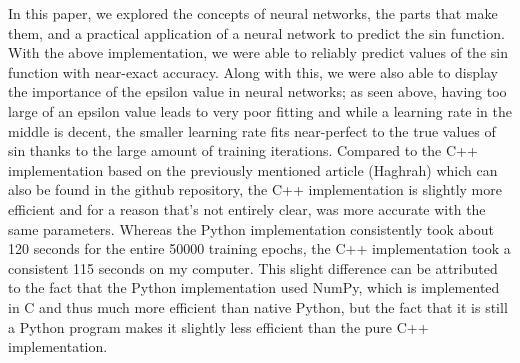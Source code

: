 \documentclass[12pt, letter]{article}
\begin{document}
In this paper, we explored the concepts of neural networks, the parts that make them, and a practical application of a neural network to predict the sin function. With the above implementation, we were able to reliably predict values of the sin function with near-exact accuracy. Along with this, we were also able to display the importance of the epsilon value in neural networks; as seen above, having too large of an epsilon value leads to very poor fitting and while a learning rate in the middle is decent, the smaller learning rate fits near-perfect to the true values of sin thanks to the large amount of training iterations. Compared to the C++ implementation based on the previously mentioned article (Haghrah) which can also be found in the github repository, the C++ implementation is slightly more efficient and for a reason that’s not entirely clear, was more accurate with the same parameters. Whereas the Python implementation consistently took about 120 seconds for the entire 50000 training epochs, the C++ implementation took a consistent 115 seconds on my computer. This slight difference can be attributed to the fact that the Python implementation used NumPy, which is implemented in C and thus much more efficient than native Python, but the fact that it is still a Python program makes it slightly less efficient than the pure C++ implementation. 
 
\newpage

\nocite{*}
\end{document}
